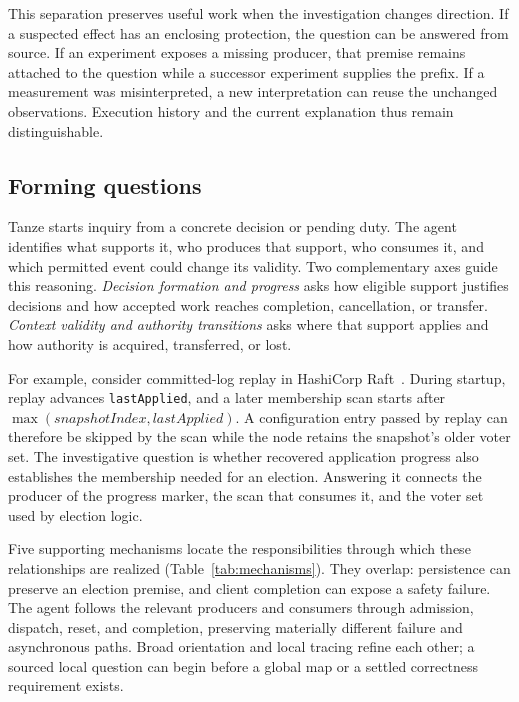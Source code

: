 \documentclass[10pt,twocolumn,letterpaper]{article}
\newcommand{\sys}{Tanze}
\newcommand{\code}[1]{\texttt{#1}}
\begin{document}
This separation preserves useful work when the investigation changes direction. If a suspected effect has an enclosing protection, the question can be answered from source. If an experiment exposes a missing producer, that premise remains attached to the question while a successor experiment supplies the prefix. If a measurement was misinterpreted, a new interpretation can reuse the unchanged observations. Execution history and the current explanation thus remain distinguishable.

\subsection{Forming questions}
\label{sec:relationships}

\sys{} starts inquiry from a concrete decision or pending duty. The agent identifies what supports it, who produces that support, who consumes it, and which permitted event could change its validity. Two complementary axes guide this reasoning. \emph{Decision formation and progress} asks how eligible support justifies decisions and how accepted work reaches completion, cancellation, or transfer. \emph{Context validity and authority transitions} asks where that support applies and how authority is acquired, transferred, or lost.

\label{sec:example}
For example, consider committed-log replay in HashiCorp Raft~\cite{hashicorp-run}. During startup, replay advances \code{lastApplied}, and a later membership scan starts after \(\max(\mathit{snapshotIndex},\mathit{lastApplied})\). A configuration entry passed by replay can therefore be skipped by the scan while the node retains the snapshot's older voter set. The investigative question is whether recovered application progress also establishes the membership needed for an election. Answering it connects the producer of the progress marker, the scan that consumes it, and the voter set used by election logic.

Five supporting mechanisms locate the responsibilities through which these relationships are realized (Table~\ref{tab:mechanisms}). They overlap: persistence can preserve an election premise, and client completion can expose a safety failure. The agent follows the relevant producers and consumers through admission, dispatch, reset, and completion, preserving materially different failure and asynchronous paths. Broad orientation and local tracing refine each other; a sourced local question can begin before a global map or a settled correctness requirement exists.
\end{document}
